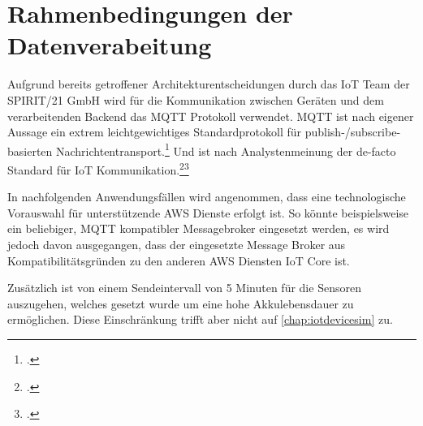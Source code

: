 \section{Rahmenbedingungen der Datenverabeitung}\label{chap:rahmendatenverarbeitung}
Aufgrund bereits getroffener Architekturentscheidungen durch das \ac{IoT} Team der SPIRIT/21 GmbH wird für die Kommunikation zwischen Geräten und dem verarbeitenden Backend das \ac{MQTT} Protokoll verwendet. \ac{MQTT} ist nach eigener Aussage ein extrem leichtgewichtiges Standardprotokoll für publish-/subscribe-basierten Nachrichtentransport.\footcite[Vgl.][]{o.V..2020} Und ist nach Analystenmeinung der de-facto Standard für \ac{IoT} Kommunikation.\footcite[Vgl.][]{Skerrett.25.10.2019}\nzitat \footcite[Vgl.][]{Cabe.17.04.2018} 

In nachfolgenden Anwendungsfällen wird angenommen, dass eine technologische Vorauswahl für unterstützende AWS Dienste erfolgt ist.
So könnte beispielsweise ein beliebiger, \ac{MQTT} kompatibler Messagebroker eingesetzt werden, es wird jedoch davon ausgegangen, dass der eingesetzte Message Broker aus Kompatibilitätsgründen zu den anderen \ac{AWS} Diensten \ac{IoT} Core ist.

Zusätzlich ist von einem Sendeintervall von 5 Minuten für die Sensoren auszugehen, welches gesetzt wurde um eine hohe Akkulebensdauer zu ermöglichen. Diese Einschränkung trifft aber nicht auf \autoref{chap:iotdevicesim} zu.

